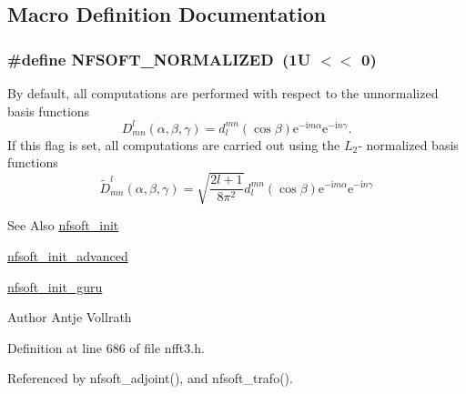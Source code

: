 \subsection{Macro Definition Documentation}
\hypertarget{group__nfsoft_ga8c53e32dd194bda4a828c15ad044d44a}{
\subsubsection[{N\-F\-S\-O\-F\-T\-\_\-\-N\-O\-R\-M\-A\-L\-I\-Z\-E\-D}]{\setlength{\rightskip}{0pt plus 5cm}\#define N\-F\-S\-O\-F\-T\-\_\-\-N\-O\-R\-M\-A\-L\-I\-Z\-E\-D~(1\-U $<$$<$ 0)}}\label{group__nfsoft_ga8c53e32dd194bda4a828c15ad044d44a}
By default, all computations are performed with respect to the unnormalized basis functions \[ D_{mn}^l(\alpha,\beta,\gamma) = d^{mn}_{l}(\cos\beta) \mathrm{e}^{-\mathrm{i} m \alpha}\mathrm{e}^{-\mathrm{i} n \gamma}. \] If this flag is set, all computations are carried out using the $L_2$-\/ normalized basis functions \[ \tilde D_{mn}^l(\alpha,\beta,\gamma) = \sqrt{\frac{2l+1}{8\pi^2}}d^{mn}_{l}(\cos\beta) \mathrm{e}^{-\mathrm{i} m \alpha}\mathrm{e}^{-\mathrm{i} n \gamma} \]

\begin{DoxySeeAlso}{See Also}
\hyperlink{group__nfsoft_ga31c884458165fa204073c6c16c10775e}{nfsoft\-\_\-init} 

\hyperlink{group__nfsoft_gaf4aec4ee2a2a5d56ca27c4f1a7f90b18}{nfsoft\-\_\-init\-\_\-advanced} 

\hyperlink{group__nfsoft_ga1c13cdd3f82f48fa41acdd313cdc2052}{nfsoft\-\_\-init\-\_\-guru} 
\end{DoxySeeAlso}
\begin{DoxyAuthor}{Author}
Antje Vollrath 
\end{DoxyAuthor}


Definition at line 686 of file nfft3.\-h.



Referenced by nfsoft\-\_\-adjoint(), and nfsoft\-\_\-trafo().

